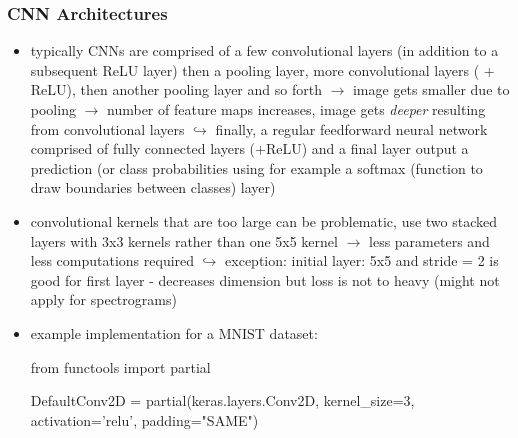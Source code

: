 \documentclass[12pt,a4paper]{article}
\begin{document}
\subsubsection{CNN Architectures} %
\label{ssub:cnn_architectures}
\begin{itemize}
  \item typically CNNs are comprised of a few convolutional layers (in addition to a subsequent ReLU layer) then a pooling layer, more convolutional layers ( + ReLU), then another pooling layer and so forth
  \newline \indent $\longrightarrow$ image gets smaller due to pooling
  \newline \indent $\longrightarrow$ number of feature maps increases, image gets \textit{deeper} resulting from convolutional layers
  \newline \indent $\hookrightarrow$ finally, a regular feedforward neural network comprised of fully connected layers (+ReLU) and a final layer output a prediction (or class probabilities using for example a softmax (function to draw boundaries between classes) layer)
  \item convolutional kernels that are too large can be problematic, use two stacked layers with 3x3 kernels rather than one 5x5 kernel
  \newline \indent $\longrightarrow$ less parameters and less computations required
  \newline \indent $\hookrightarrow$ exception: initial layer: 5x5 and stride = 2 is good for first layer - decreases dimension but loss is not to heavy (might not apply for spectrograms)
  \item example implementation for a MNIST dataset:
  \begin{python}
    from functools import partial
    
    DefaultConv2D = partial(keras.layers.Conv2D,
                            kernel_size=3, 
                            activation='relu', 
                            padding="SAME")


\end{python}
\end{itemize}
\end{document}
